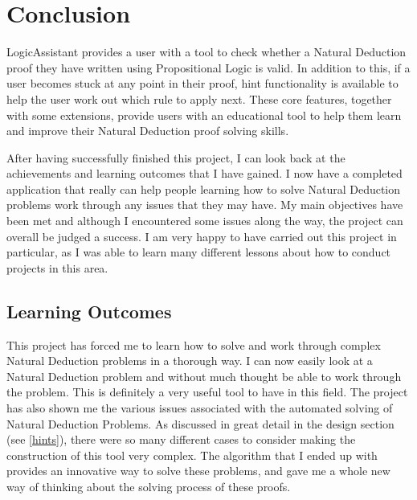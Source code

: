 \pagebreak
\section{Conclusion}

LogicAssistant provides a user with a tool to check whether a Natural Deduction proof they have written using Propositional Logic is valid. In addition to this, if a user becomes stuck at any point in their proof, hint functionality is available to help the user work out which rule to apply next. These core features, together with some extensions, provide users with an educational tool to help them learn and improve their Natural Deduction proof solving skills. 

After having successfully finished this project, I can look back at the achievements and learning outcomes that I have gained. I now have a completed application that really can help people learning how to solve Natural Deduction problems work through any issues that they may have. My main objectives have been met and although I encountered some issues along the way, the project can overall be judged a success. I am very happy to have carried out this project in particular, as I was able to learn many different lessons about how to conduct projects in this area.

\subsection{Learning Outcomes}
This project has forced me to learn how to solve and work through complex Natural Deduction problems in a thorough way. I can now easily look at a Natural Deduction problem and without much thought be able to work through the problem. This is definitely a very useful tool to have in this field. The project has also shown me the various issues associated with the automated solving of Natural Deduction Problems. As discussed in great detail in the design section (see \ref{hints}), there were so many different cases to consider making the construction of this tool very complex. The algorithm that I ended up with provides an innovative way to solve these problems, and gave me a whole new way of thinking about the solving process of these proofs. 

